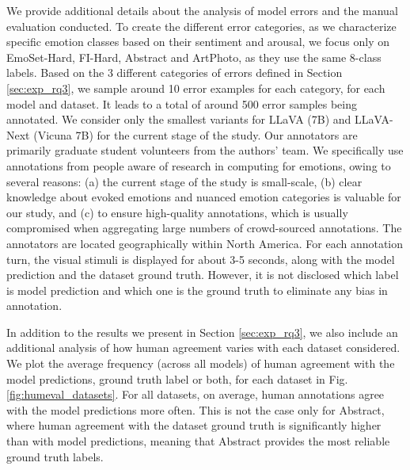 We provide additional details about the analysis of model errors and the manual evaluation conducted. To create the different error categories, as we characterize specific emotion classes based on their sentiment and arousal, we focus only on EmoSet-Hard, FI-Hard, Abstract and ArtPhoto, as they use the same 8-class labels. Based on the 3 different categories of errors defined in Section \ref{sec:exp_rq3}, we sample around 10 error examples for each category, for each model and dataset. It leads to a total of around 500 error samples being annotated. We consider only the smallest variants for LLaVA (7B) and LLaVA-Next (Vicuna 7B) for the current stage of the study. Our annotators are primarily graduate student volunteers from the authors' team. We specifically use annotations from people aware of research in computing for emotions, owing to several reasons: (a) the current stage of the study is small-scale, (b) clear knowledge about evoked emotions and nuanced emotion categories is valuable for our study, and (c) to ensure high-quality annotations, which is usually compromised when aggregating large numbers of crowd-sourced annotations. The annotators are located geographically within North America. For each annotation turn, the visual stimuli is displayed for about 3-5 seconds, along with the model prediction and the dataset ground truth. However, it is not disclosed which label is model prediction and which one is the ground truth to eliminate any bias in annotation. 

In addition to the results we present in Section \ref{sec:exp_rq3}, we also include an additional analysis of how human agreement varies with each dataset considered. We plot the average frequency (across all models) of human agreement with the model predictions, ground truth label or both, for each dataset in Fig. \ref{fig:humeval_datasets}. For all datasets, on average, human annotations agree with the model predictions more often. This is not the case only for Abstract, where human agreement with the dataset ground truth is significantly higher than with model predictions, meaning that Abstract provides the most reliable ground truth labels. 

